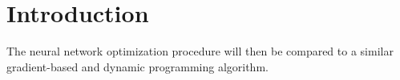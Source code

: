 
\section{Introduction}
The neural network optimization procedure will then be compared to a similar gradient-based and dynamic programming algorithm.